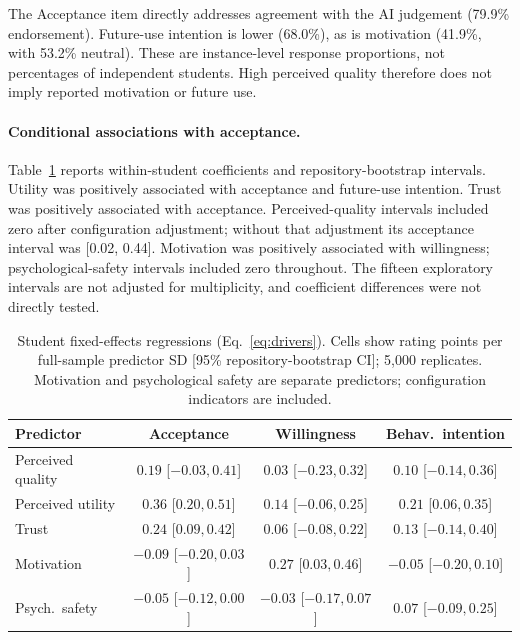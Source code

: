 \documentclass[runningheads]{llncs}
\begin{document}
The Acceptance item directly addresses agreement with the AI judgement (79.9\% endorsement). Future-use intention is lower (68.0\%), as is motivation (41.9\%, with 53.2\% neutral). These are instance-level response proportions, not percentages of independent students. High perceived quality therefore does not imply reported motivation or future use.

\paragraph{Conditional associations with acceptance.}
Table~\ref{tab:drivers} reports within-student coefficients and repository-bootstrap intervals. Utility was positively associated with acceptance and future-use intention. Trust was positively associated with acceptance. Perceived-quality intervals included zero after configuration adjustment; without that adjustment its acceptance interval was [0.02, 0.44]. Motivation was positively associated with willingness; psychological-safety intervals included zero throughout. The fifteen exploratory intervals are not adjusted for multiplicity, and coefficient differences were not directly tested.

\begin{table}[t]
\caption{Student fixed-effects regressions (Eq.~\ref{eq:drivers}). Cells show rating points per full-sample predictor SD [95\% repository-bootstrap CI]; 5{,}000 replicates. Motivation and psychological safety are separate predictors; configuration indicators are included.}
\label{tab:drivers}
\centering\scriptsize
\setlength\tabcolsep{3pt}
\begin{tabular}{@{}lccc@{}}
\toprule
Predictor & Acceptance & Willingness & Behav.\ intention \\
\midrule
Perceived quality & $0.19$ [$ -0.03, 0.41 $] & $0.03$ [$ -0.23, 0.32 $] & $0.10$ [$ -0.14, 0.36 $] \\
Perceived utility & $0.36$ [$ 0.20, 0.51 $] & $0.14$ [$ -0.06, 0.25 $] & $0.21$ [$ 0.06, 0.35 $] \\
Trust & $0.24$ [$ 0.09, 0.42 $] & $0.06$ [$ -0.08, 0.22 $] & $0.13$ [$ -0.14, 0.40 $] \\
Motivation & $-0.09$ [$ -0.20, 0.03 $] & $0.27$ [$ 0.03, 0.46 $] & $-0.05$ [$ -0.20, 0.10 $] \\
Psych.\ safety & $-0.05$ [$ -0.12, 0.00 $] & $-0.03$ [$ -0.17, 0.07 $] & $0.07$ [$ -0.09, 0.25 $] \\
\bottomrule
\end{tabular}
\end{table}
\end{document}
